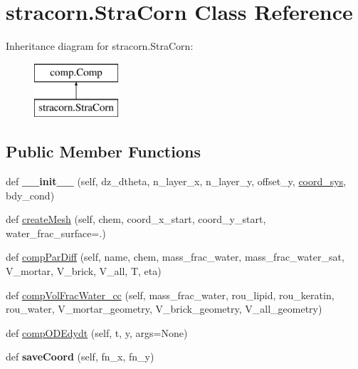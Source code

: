 \hypertarget{classstracorn_1_1StraCorn}{}\section{stracorn.\+Stra\+Corn Class Reference}
\label{classstracorn_1_1StraCorn}
Inheritance diagram for stracorn.\+Stra\+Corn\+:\begin{figure}[H]
\begin{center}
\leavevmode
\includegraphics[height=2.000000cm]{classstracorn_1_1StraCorn}
\end{center}
\end{figure}
\subsection*{Public Member Functions}
\begin{DoxyCompactItemize}
\item 
def {\bfseries \+\_\+\+\_\+init\+\_\+\+\_\+} (self, dz\+\_\+dtheta, n\+\_\+layer\+\_\+x, n\+\_\+layer\+\_\+y, offset\+\_\+y, \hyperlink{classcomp_1_1Comp_ae00e132d485d50acaf13977284fd9051}{coord\+\_\+sys}, bdy\+\_\+cond)\hypertarget{classstracorn_1_1StraCorn_a07746366f391cc3a2bc1e30a6f08e221}{}\label{classstracorn_1_1StraCorn_a07746366f391cc3a2bc1e30a6f08e221}

\item 
def \hyperlink{classstracorn_1_1StraCorn_ade20b5300f4291868c5f7fc16d83726c}{create\+Mesh} (self, chem, coord\+\_\+x\+\_\+start, coord\+\_\+y\+\_\+start, water\+\_\+frac\+\_\+surface=.)
\item 
def \hyperlink{classstracorn_1_1StraCorn_ad03208d3f570174098bd28e580ae6ca3}{comp\+Par\+Diff} (self, name, chem, mass\+\_\+frac\+\_\+water, mass\+\_\+frac\+\_\+water\+\_\+sat, V\+\_\+mortar, V\+\_\+brick, V\+\_\+all, T, eta)
\item 
def \hyperlink{classstracorn_1_1StraCorn_aec5858fcc6ac21d7a9051dc34d2ccd18}{comp\+Vol\+Frac\+Water\+\_\+cc} (self, mass\+\_\+frac\+\_\+water, rou\+\_\+lipid, rou\+\_\+keratin, rou\+\_\+water, V\+\_\+mortar\+\_\+geometry, V\+\_\+brick\+\_\+geometry, V\+\_\+all\+\_\+geometry)
\item 
def \hyperlink{classstracorn_1_1StraCorn_ad948bfa716b6245eb4917785e9bc2689}{comp\+O\+D\+Edydt} (self, t, y, args=None)
\item 
def {\bfseries save\+Coord} (self, fn\+\_\+x, fn\+\_\+y)\hypertarget{classstracorn_1_1StraCorn_a76b1184986bb0ce9ad0d514d83f7934c}{}\label{classstracorn_1_1StraCorn_a76b1184986bb0ce9ad0d514d83f7934c}

\end{DoxyCompactItemize}
